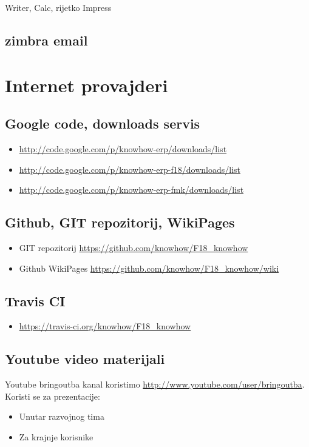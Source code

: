 \documentclass[times, utf8, seminar]{fit}
\begin{document}
Writer, Calc, rijetko Impress

\section{zimbra email}

\chapter{Internet provajderi}

\section{Google code, downloads servis}

\begin{itemize}
  \item \url{http://code.google.com/p/knowhow-erp/downloads/list}
  \item \url{http://code.google.com/p/knowhow-erp-f18/downloads/list}
  \item \url{http://code.google.com/p/knowhow-erp-fmk/downloads/list}
\end{itemize}

\section{Github, GIT repozitorij, WikiPages }

\begin{itemize}
  \item GIT repozitorij \url{https://github.com/knowhow/F18_knowhow}
  \item Github WikiPages \url{https://github.com/knowhow/F18_knowhow/wiki} 
\end{itemize}

\section{Travis CI}

\begin{itemize}
  \item \url{https://travis-ci.org/knowhow/F18_knowhow}
\end{itemize}

\section{Youtube video materijali}

Youtube bringoutba kanal koristimo \url{http://www.youtube.com/user/bringoutba}. Koristi se za prezentacije:
\begin{itemize}
 \item Unutar razvojnog tima
 \item Za krajnje korisnike
\end{itemize}
\end{document}
